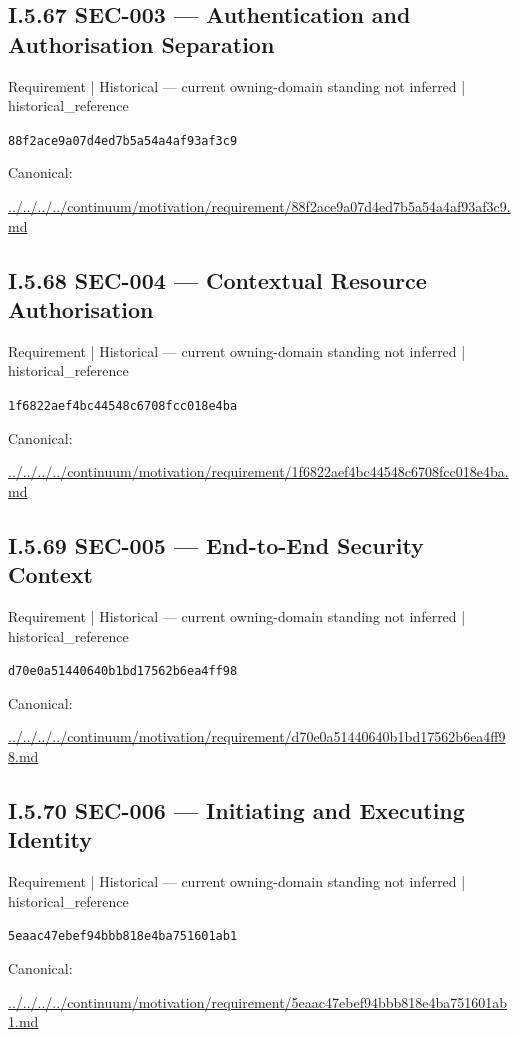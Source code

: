 \documentclass[10pt,a4paper]{article}
\begin{document}
\subsection*{I.5.67 SEC-003 — Authentication and Authorisation Separation}
{\small Requirement | Historical — current owning-domain standing not inferred | historical\_reference}\par
\texttt{88f2ace9a07d4ed7b5a54a4af93af3c9}\par
Canonical: \par
{\footnotesize\url{../../../../continuum/motivation/requirement/88f2ace9a07d4ed7b5a54a4af93af3c9.md}}\par
\subsection*{I.5.68 SEC-004 — Contextual Resource Authorisation}
{\small Requirement | Historical — current owning-domain standing not inferred | historical\_reference}\par
\texttt{1f6822aef4bc44548c6708fcc018e4ba}\par
Canonical: \par
{\footnotesize\url{../../../../continuum/motivation/requirement/1f6822aef4bc44548c6708fcc018e4ba.md}}\par
\subsection*{I.5.69 SEC-005 — End-to-End Security Context}
{\small Requirement | Historical — current owning-domain standing not inferred | historical\_reference}\par
\texttt{d70e0a51440640b1bd17562b6ea4ff98}\par
Canonical: \par
{\footnotesize\url{../../../../continuum/motivation/requirement/d70e0a51440640b1bd17562b6ea4ff98.md}}\par
\subsection*{I.5.70 SEC-006 — Initiating and Executing Identity}
{\small Requirement | Historical — current owning-domain standing not inferred | historical\_reference}\par
\texttt{5eaac47ebef94bbb818e4ba751601ab1}\par
Canonical: \par
{\footnotesize\url{../../../../continuum/motivation/requirement/5eaac47ebef94bbb818e4ba751601ab1.md}}\par
\end{document}
